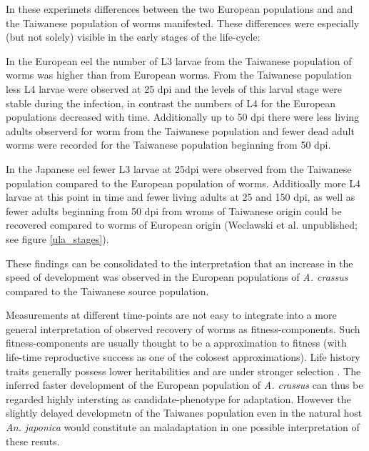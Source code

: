 In these experimets differences between the two European populations
and and the Taiwanese population of worms manifested. These
differences were especially (but not solely) visible in the early
stages of the life-cycle:

In the European eel the number of L3 larvae from the Taiwanese
population of worms was higher than from European worms. From the
Taiwanese population less L4 larvae were observed at 25 dpi and the
levels of this larval stage were stable during the infection, in
contrast the numbers of L4 for the European populations decreased with
time. Additionally up to 50 dpi there were less living adults
observerd for worm from the Taiwanese population and fewer dead adult
worms were recorded for the Taiwanese population beginning from 50
dpi.

In the Japanese eel fewer L3 larvae at 25dpi were observed from the
Taiwanese population compared to the European population of
worms. Additioally more L4 larvae at this point in time and fewer
living adults at 25 and 150 dpi, as well as fewer adults beginning
from 50 dpi from wroms of Taiwanese origin could be recovered compared
to worms of European origin (Weclawski et al. unpublished; see figure
\ref{ula_stages}).

These findings can be consolidated to the interpretation that an
increase in the speed of development was observed in the European
populations of \textit{A. crassus} compared to the Taiwanese source
population.

Measurements at different time-points are not easy to integrate into a
more general interpretation of observed recovery of worms as
fitness-components. Such fitness-components are usually thought to be
a approximation to fitness (with life-time reproductive success as one
of the colosest approximations). Life history traits generally possess
lower heritabilities and are under stronger selection
\cite{pmid3316130}. The inferred faster development of the European
population of \textit{A. crassus} can thus be regarded highly
intersting as candidate-phenotype for adaptation. However the slightly
delayed developmetn of the Taiwanes population even in the natural
host \textit{An. japonica} would constitute an maladaptation
\cite{pmid21708731} in one possible interpretation of these resuts.

